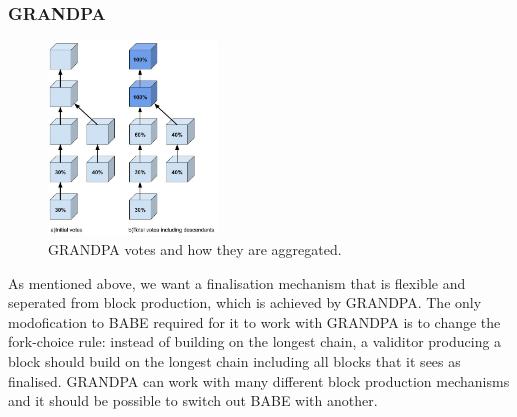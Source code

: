 \subsubsection{GRANDPA} \label{sec:grandpa}
\begin{figure}[h!]
  \centering
  \includegraphics[width=0.4\textwidth]{images/Grandpa.jpg}
  \caption{GRANDPA votes and how they are aggregated.}
    \label{fig:grandpa}
\end{figure}

As mentioned above, we want a finalisation mechanism that is flexible and seperated from block production, which is achieved by GRANDPA. The only modofication to BABE required for it to work with GRANDPA is to change the fork-choice rule: instead of building on the longest chain, a validitor producing a block should build on the longest chain including all blocks that it sees as finalised. GRANDPA can work with many different block production mechanisms and it should be possible to switch out BABE with another.